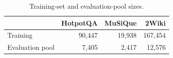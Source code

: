 \begin{table}[pos=!htb]
\caption{Training-set and evaluation-pool sizes.}
\label{size}
\centering
\small
\setlength{\tabcolsep}{8pt}
\begin{tabular}{lrrr}
\toprule
& \textbf{HotpotQA} & \textbf{MuSiQue} & \textbf{2Wiki} \\
\midrule
Training
& 90,447 & 19,938 & 167,454 \\
\midrule
Evaluation pool
& 7,405 & 2,417 & 12,576 \\
\bottomrule
\end{tabular}
\end{table}
